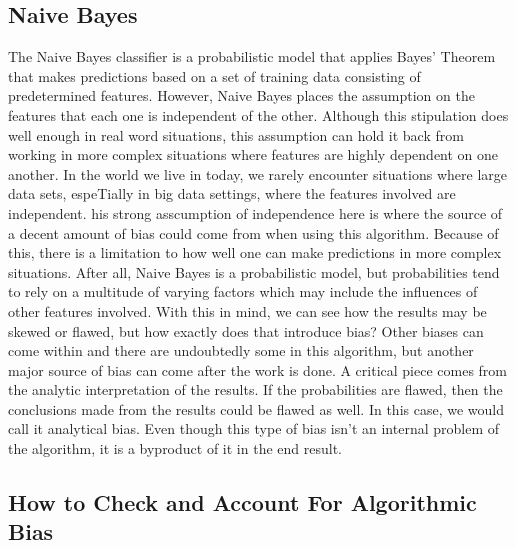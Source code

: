 \documentclass[sigconf]{acmart}
\begin{document}
\subsection{Naive Bayes}

The Naive Bayes classifier is a probabilistic model that applies Bayes' Theorem that makes predictions based on a set of training data consisting of predetermined features. However, Naive Bayes places the assumption on the features that each one is independent of the other. Although this stipulation does well enough in real word situations, this assumption can hold it back from working in more complex situations where features are highly dependent on one another. In the world we live in today, we rarely encounter situations where large data sets, espeTially in big data settings, where the features involved are independent. his strong asscumption of independence here is where the source of a decent amount of bias could come from when using this algorithm. Because of this, there is a limitation to how well one can make predictions in more complex situations. After all, Naive Bayes is a probabilistic model, but probabilities tend to rely on a multitude of varying factors which may include the influences of other features involved.  With this in mind, we can see how the results may be skewed or flawed, but how exactly does that introduce bias? Other biases can come within and there are undoubtedly some in this algorithm, but another major source of bias can come after the work is done. A critical piece comes from the analytic interpretation of the results. If the probabilities are flawed, then the conclusions made from the results could be flawed as well. In this case, we would call it analytical bias. Even though this type of bias isn't an internal problem of the algorithm, it is a byproduct of it in the end result.

\subsection{How to Check and Account For Algorithmic Bias}
\end{document}
